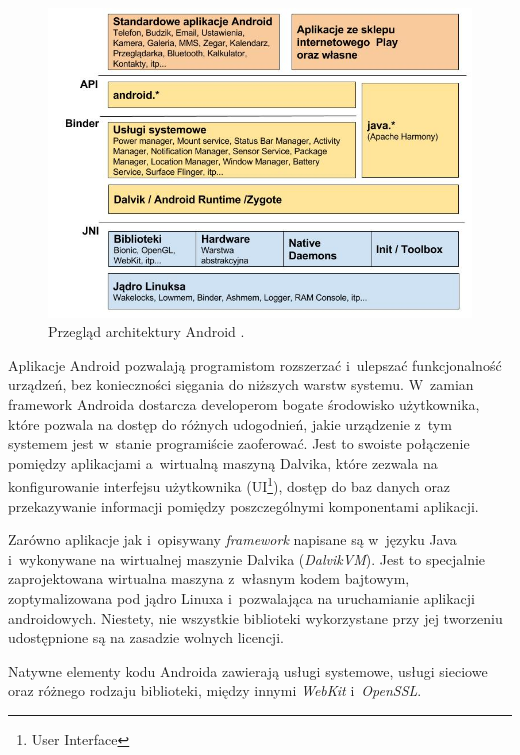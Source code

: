 \begin{figure}[!htb]
    \centering
    \includegraphics[width=14cm]{imgs/ch3_android_architecture_1.jpg}
    \caption
{Przegląd architektury Android \cite{website:android:przegladarchitektury}.}
    \label{fig:ch3_android_architecture_1}
\end{figure} 

\newpage
Aplikacje Android pozwalają programistom rozszerzać i~ulepszać funkcjonalność urządzeń, bez konieczności sięgania do niższych warstw systemu. W~zamian framework Androida dostarcza developerom bogate środowisko użytkownika, które pozwala na dostęp do różnych udogodnień, jakie urządzenie z~tym systemem jest w~stanie programiście zaoferować. Jest to swoiste połączenie pomiędzy aplikacjami a~wirtualną maszyną Dalvika, które zezwala na konfigurowanie interfejsu użytkownika (UI\footnote{User Interface}), dostęp do baz danych oraz przekazywanie informacji pomiędzy poszczególnymi komponentami aplikacji.

Zarówno aplikacje jak i~opisywany \textit{framework} napisane są w~języku Java i~wykonywane na wirtualnej maszynie Dalvika (\textit{DalvikVM}). Jest to specjalnie zaprojektowana wirtualna maszyna z~własnym kodem bajtowym, zoptymalizowana pod jądro Linuxa i~pozwalająca na uruchamianie aplikacji androidowych. Niestety, nie wszystkie biblioteki wykorzystane przy jej tworzeniu udostępnione są na zasadzie wolnych licencji.

Natywne elementy kodu Androida zawierają usługi systemowe, usługi sieciowe oraz różnego rodzaju biblioteki, między innymi \textit{WebKit} i~\textit{OpenSSL}. 

